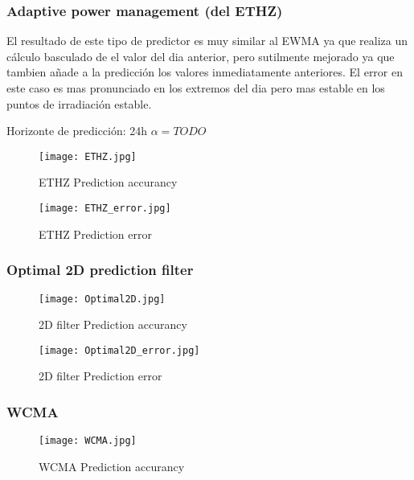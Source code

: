 \subsubsection{Adaptive power management (del ETHZ)}
 \label{ssub:adaptive_power_management}

El resultado de este tipo de predictor es muy similar al EWMA ya que realiza un cálculo basculado de el valor del dia anterior, pero sutilmente mejorado ya que tambien añade a la predicción los valores inmediatamente anteriores. El error en este caso es mas pronunciado en los extremos del dia pero mas estable en los puntos de irradiación estable.

Horizonte de predicción: 24h
$\alpha = TODO$

\begin{figure}[h]
    \texttt{[image: ETHZ.jpg]}
    \caption{ETHZ Prediction accurancy}
    \label{fig:ethz_comp}
\end{figure}

\begin{figure}[h]
    \texttt{[image: ETHZ\_error.jpg]}
    \caption{ETHZ Prediction error}
    \label{fig:ethz_error}
\end{figure}


\subsubsection{Optimal 2D prediction filter} 
\label{ssub:optimal_2d_prediction_filter}

\begin{figure}[h]
    \texttt{[image: Optimal2D.jpg]}
    \caption{2D filter Prediction accurancy}
    \label{fig:o2d_comp}
\end{figure}

\begin{figure}[h]
    \texttt{[image: Optimal2D\_error.jpg]}
    \caption{2D filter Prediction error}
    \label{fig:o2d_error}
\end{figure}


\subsubsection{WCMA} 
\label{ssub:wcma}

\begin{figure}[h]
    \texttt{[image: WCMA.jpg]}
    \caption{WCMA Prediction accurancy}
    \label{fig:wcma_comp}
\end{figure}

